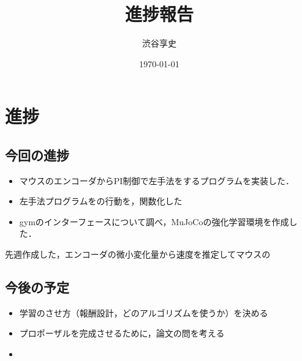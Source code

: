 \documentclass[a4paper,11pt]{jsarticle}
\begin{document}
\title{進捗報告}
\author{渋谷享史}
\date{\today}
\maketitle

\section{進捗}
\subsection{今回の進捗}
\begin{itemize}
  \item マウスのエンコーダからPI制御で左手法をするプログラムを実装した．
  \item 左手法プログラムをの行動を，関数化した
  \item gymのインターフェースについて調べ，MuJoCoの強化学習環境を作成した．
\end{itemize}

先週作成した，エンコーダの微小変化量から速度を推定してマウスの

\subsection{今後の予定}
\begin{itemize}
  \item 学習のさせ方（報酬設計，どのアルゴリズムを使うか）を決める
  \item プロポーザルを完成させるために，論文の問を考える
  \item 
\end{itemize}
\end{document}
